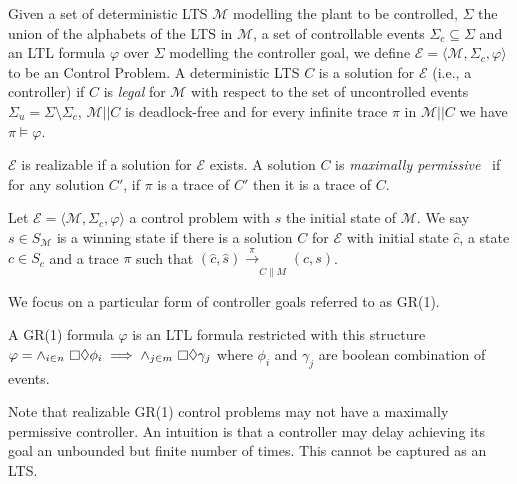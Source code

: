 \begin{definition}
\label{def:control-problem}
Given a set of deterministic LTS $\mathcal{M}$ modelling the plant to be controlled, $\Sigma$ the union of the alphabets of the LTS in $\mathcal{M}$, a set of controllable events $\Sigma_c \subseteq \Sigma$ and an LTL formula $\varphi$ over $\Sigma$ modelling the controller goal, we define $\mathcal{E} = \langle \mathcal{M}, \Sigma_c, \varphi  \rangle$ to be an Control Problem. A deterministic LTS $C$ is a solution for $\mathcal{E}$  (i.e., a controller) if $C$ is \textit{legal} for $\mathcal{M}$ with respect to the set of uncontrolled events $\Sigma_u = \Sigma \setminus \Sigma_c$, $\mathcal{M} || C$ is deadlock-free and for every infinite trace $\pi$ in $\mathcal{M} || C$  we have $\pi \vDash \varphi$. 
\end{definition}

$\mathcal{E}$ is realizable if a solution for $\mathcal{E}$ exists. A solution $C$ is \textit{maximally permissive}~\cite{DBLP:journals/tase/HuangK08} if for any solution $C'$, if $\pi$ is a trace of $C'$ then it is a trace of $C$. 

\begin{definition}
Let $\mathcal{E} = \langle \mathcal{M}, \Sigma_c, \varphi  \rangle$ a  control problem with $\hat{s}$ the initial state of $\mathcal{M}$. We say $s \in S_{\mathcal{M}}$ is a winning state if there is a solution $C$ for $\mathcal{E}$ with initial state $\hat{c}$, a state $c \in S_c$ and a trace $\pi$ such that $(\hat{c},\hat{s}) \xrightarrow[]{\pi}_{C\|M} (c, s)$.

\end{definition}

We focus on a particular form of controller goals referred to as GR(1).

\begin{definition} A 
GR(1) formula $\varphi$ is an LTL formula restricted with this structure $\varphi = 
\wedge_{i \in n} \ \always\eventually \phi_i \implies \wedge_{j \in m} \ 
\always\eventually \gamma_j$ where $\phi_i$ and $\gamma_j$ are boolean 
combination of events.
\end{definition}

Note that realizable GR(1) control problems may not have a maximally permissive controller. 
An intuition is that a 
controller may delay achieving its goal an unbounded but finite number of times. This  cannot be captured as an LTS. 

